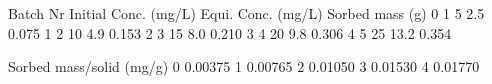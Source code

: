 \documentclass[letterpaper,10pt,english]{sphinxmanual}
\begin{document}
\begin{sphinxVerbatim}[commandchars=\\\{\}]
   Batch Nr  Initial Conc. (mg/L)  Equi. Conc. (mg/L)  Sorbed mass (g)  \PYGZbs{}
0         1                     5                 2.5            0.075   
1         2                    10                 4.9            0.153   
2         3                    15                 8.0            0.210   
3         4                    20                 9.8            0.306   
4         5                    25                13.2            0.354   

   Sorbed mass/solid (mg/g)  
0                   0.00375  
1                   0.00765  
2                   0.01050  
3                   0.01530  
4                   0.01770  
\end{sphinxVerbatim}
\end{document}
